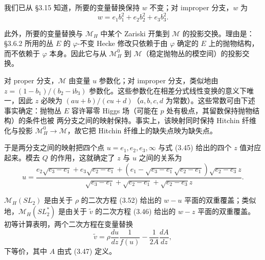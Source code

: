 \documentclass[11pt,a4paper]{article}
\begin{document}
我们已从 §3.15 知道，所要的变量替换保持 $w$ 不变；对 improper 分支，$w$ 为
\begin{equation}\tag{3.54}
w=e_1b_1^2+e_2b_2^2+e_3b_3^2.
\end{equation}

此外，所要的变量替换与 $\mathcal{M}_H$ 中某个 Zariski 开集到 $\mathcal{M}$ 的投影交换。理由是：§3.6.2 所用的丛 $E$ 的 $\varphi$-不变 Hecke 修改只依赖于由 $\varphi$ 确定的 $E$ 上的抛物结构，而不依赖于 $\varphi$ 本身。因此它与从 $\mathcal{M}_H^0$ 到 $\mathcal{M}$（稳定抛物丛的模空间）的投影交换。

对 proper 分支，$\mathcal{M}$ 由变量 $u$ 参数化；对 improper 分支，类似地由 $z=(1-b_1)/(b_2-\mathrm{i}b_3)$ 参数化。这些参数化在相差分式线性变换的意义下唯一，因此 $z$ 必映为 $(au+b)/(cu+d)$（$a,b,c,d$ 为常数）。这些常数可由下述事实确定：抛物丛 $E$ 容许幂零 Higgs 场（可能在 $p$ 处有极点，其留数保持抛物结构）的条件也被
两分支之间的映射保持。事实上，该映射同时保持 Hitchin 纤维化与投影 $\mathcal{M}_H^0\to\mathcal{M}$，故它把 Hitchin 纤维上的缺失点映为缺失点。

于是两分支之间的映射把四个点 $u=e_1,e_2,e_3,\infty$ 与式 (3.45) 给出的四个 $z$ 值对应起来。模去 $Q$ 的作用，这就确定了 $z$ 与 $u$ 之间的关系为
\begin{equation}\tag{3.55}
u=\frac{e_2\sqrt{e_3-e_1}+e_3\sqrt{e_2-e_1}+(e_1-\sqrt{e_3-e_1}\sqrt{e_2-e_1})\sqrt{e_2-e_3}z}{\sqrt{e_3-e_1}+\sqrt{e_2-e_1}+\sqrt{e_2-e_3}z}.
\end{equation}

$\mathcal{M}_H(SL_2)$ 是由关于 $\rho$ 的二次方程 (3.52) 给出的 $w-u$ 平面的双重覆盖；类似地，$\mathcal{M}_H(SL_2^*)$ 是由关于 $\tilde v$ 的二次方程 (3.46) 给出的 $w-z$ 平面的双重覆盖。初等计算表明，两个二次方程在变量替换
\begin{equation}\tag{3.56}
\tilde v=\rho\frac{du}{dz}\frac{1}{f(u)}-\frac{1}{2A}\frac{dA}{dz},
\end{equation}
下等价，其中 $A$ 由式 (3.47) 定义。
\end{document}
